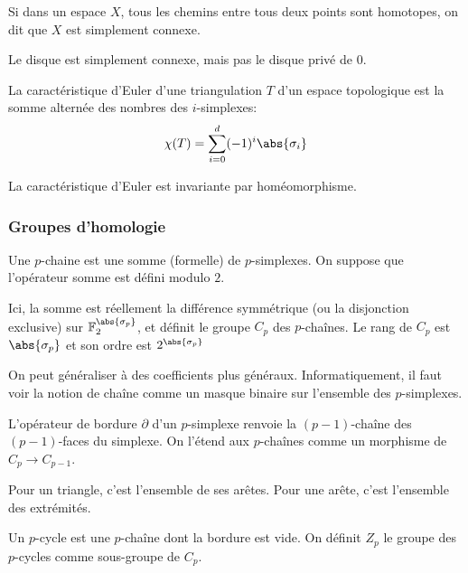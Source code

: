 \documentclass[info, math]{mpb-cours}
\begin{document}
\begin{definition}
	Si dans un espace $X$, tous les chemins entre tous deux points sont homotopes, on dit que $X$ est simplement connexe.
\end{definition}
Le disque est simplement connexe, mais pas le disque privé de $0$.

\begin{definition}
	La caractéristique d'Euler d'une triangulation $T$ d'un espace topologique est la somme alternée des nombres des $i$-simplexes:
	\begin{equation*}
		\chi(T) = \sum_{i=0}^{d} (-1)^{i}\abs{\sigma_{i}}
	\end{equation*}
\end{definition}

\begin{proposition}
	La caractéristique d'Euler est invariante par homéomorphisme.
\end{proposition}

\subsubsection{Groupes d'homologie}
\begin{definition}
	Une $p$-chaine est une somme (formelle) de $p$-simplexes. On suppose que l'opérateur somme est défini modulo $2$.
\end{definition}
Ici, la somme est réellement la différence symmétrique (ou la disjonction exclusive) sur $\mathbb{F}_{2}^{\abs{\sigma_{p}}}$, et définit le groupe $C_{p}$ des $p$-chaînes.
Le rang de $C_{p}$ est $\abs{\sigma_{p}}$ et son ordre est $2^{\abs{\sigma_{p}}}$


On peut généraliser à des coefficients plus généraux.
Informatiquement, il faut voir la notion de chaîne comme un masque binaire sur l'ensemble des $p$-simplexes.

\begin{definition}
	L'opérateur de bordure $\partial$ d'un $p$-simplexe renvoie la $(p-1)$-chaîne des $(p-1)$-faces du simplexe.
	On l'étend aux $p$-chaînes comme un morphisme de $C_{p} \to C_{p - 1}$.
\end{definition}
Pour un triangle, c'est l'ensemble de ses arêtes. Pour une arête, c'est l'ensemble des extrémités.

\begin{definition}
	Un $p$-cycle est une $p$-chaîne dont la bordure est vide.
	On définit $Z_{p}$ le groupe des $p$-cycles comme sous-groupe de $C_{p}$.
\end{definition}
\end{document}
